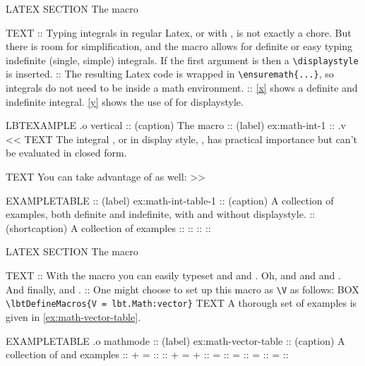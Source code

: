 \begin{lbt}
    LATEX \FloatBarrier
    SECTION The  macro

    TEXT
    :: Typing integrals in regular Latex, or with , is not exactly a chore. But there is room for simplification, and the  macro allows for definite or easy typing indefinite (single, simple) integrals. If the first argument is  then a \Verb|\displaystyle| is inserted.
    :: The resulting Latex code is wrapped in \Verb|\ensuremath{...}|, so integrals do not need to be inside a math environment.
    :: \cref{x} shows a definite and indefinite integral. \cref{y} shows the use of  for displaystyle.

    LBTEXAMPLE .o vertical
    :: (caption) The  macro
    :: (label) ex:math-int-1
    :: .v <<
      TEXT The integral , or in display style, , has practical importance but can't be evaluated in closed form.

      TEXT You can take advantage of  as well: 
    >>

    EXAMPLETABLE
    :: (label) ex:math-int-table-1
    :: (caption) A collection of  examples, both definite and indefinite, with and without displaystyle.
    :: (shortcaption) A collection of  examples
    :: 
    :: 
    :: 
    :: 



    LATEX \FloatBarrier
    SECTION The  macro

    TEXT
    :: With the  macro you can easily typeset  and  and . Oh, and  and  and . And finally,  and .
    :: One might choose to set up this macro as \Verb|\V| as follows:
    BOX \verb|\lbtDefineMacros{V = lbt.Math:vector}|
    TEXT A thorough set of examples is given in \cref{ex:math-vector-table}.

    EXAMPLETABLE .o mathmode
    :: (label) ex:math-vector-table
    :: (caption) A collection of  and  examples
    ::  +  = 
    :: 
    ::  +  =  + 
    ::  = 
    ::  = 
    ::  = 
    ::  = 
    :: 


\end{lbt}
